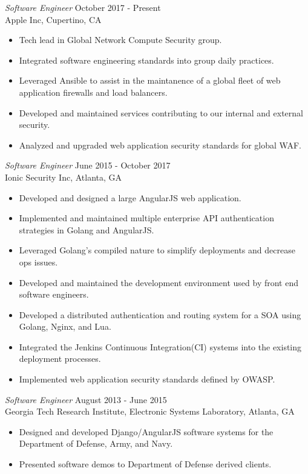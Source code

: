 \documentclass[margin, 10pt]{res} %
\begin{document}
\begin{resume}
{\sl Software Engineer} \hfill October 2017 - Present \\
Apple Inc, Cupertino, CA
\begin{itemize}
\item Tech lead in Global Network Compute Security group.
\item Integrated software engineering standards into group daily practices.
\item Leveraged Ansible to assist in the maintanence of a global fleet of web application firewalls and load balancers.
\item Developed and maintained services contributing to our internal and external security.
\item Analyzed and upgraded web application security standards for global WAF.
\end{itemize} 

{\sl Software Engineer} \hfill June 2015 - October 2017 \\
Ionic Security Inc, Atlanta, GA
\begin{itemize}
\item Developed and designed a large AngularJS web application.
\item Implemented and maintained multiple enterprise API authentication strategies in Golang and AngularJS.
\item Leveraged Golang's compiled nature to simplify deployments and decrease ops issues.
\item Developed and maintained the development environment used by front end software engineers.
\item Developed a distributed authentication and routing system for a SOA using Golang, Nginx, and Lua.
\item Integrated the Jenkins Continuous Integration(CI) systems into the existing deployment processes.
\item Implemented web application security standards defined by OWASP.
\end{itemize} 

{\sl Software Engineer} \hfill August 2013 - June 2015 \\
Georgia Tech Research Institute, Electronic Systems Laboratory, Atlanta, GA 
\begin{itemize} \itemsep -2pt %
\item Designed and developed Django/AngularJS software systems for the Department of Defense, Army, and Navy.
\item Presented software demos to Department of Defense derived clients.
\end{itemize}
 

\end{resume}
\end{document}
